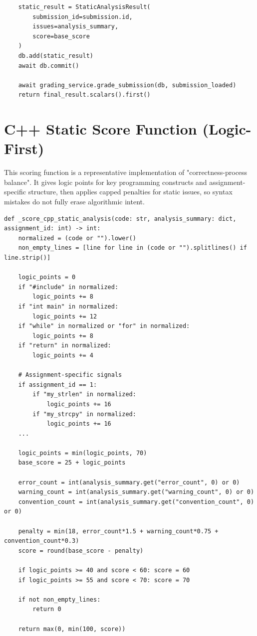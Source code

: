 \begin{verbatim}
    static_result = StaticAnalysisResult(
        submission_id=submission.id,
        issues=analysis_summary,
        score=base_score
    )
    db.add(static_result)
    await db.commit()

    await grading_service.grade_submission(db, submission_loaded)
    return final_result.scalars().first()
\end{verbatim}

\section{C++ Static Score Function (Logic-First)}
This scoring function is a representative implementation of "correctness-process balance". It gives logic points for key programming constructs and assignment-specific structure, then applies capped penalties for static issues, so syntax mistakes do not fully erase algorithmic intent.

\begin{verbatim}
def _score_cpp_static_analysis(code: str, analysis_summary: dict, assignment_id: int) -> int:
    normalized = (code or "").lower()
    non_empty_lines = [line for line in (code or "").splitlines() if line.strip()]

    logic_points = 0
    if "#include" in normalized:
        logic_points += 8
    if "int main" in normalized:
        logic_points += 12
    if "while" in normalized or "for" in normalized:
        logic_points += 8
    if "return" in normalized:
        logic_points += 4

    # Assignment-specific signals
    if assignment_id == 1:
        if "my_strlen" in normalized:
            logic_points += 16
        if "my_strcpy" in normalized:
            logic_points += 16
    ...

    logic_points = min(logic_points, 70)
    base_score = 25 + logic_points

    error_count = int(analysis_summary.get("error_count", 0) or 0)
    warning_count = int(analysis_summary.get("warning_count", 0) or 0)
    convention_count = int(analysis_summary.get("convention_count", 0) or 0)

    penalty = min(18, error_count*1.5 + warning_count*0.75 + convention_count*0.3)
    score = round(base_score - penalty)

    if logic_points >= 40 and score < 60: score = 60
    if logic_points >= 55 and score < 70: score = 70

    if not non_empty_lines:
        return 0

    return max(0, min(100, score))
\end{verbatim}


